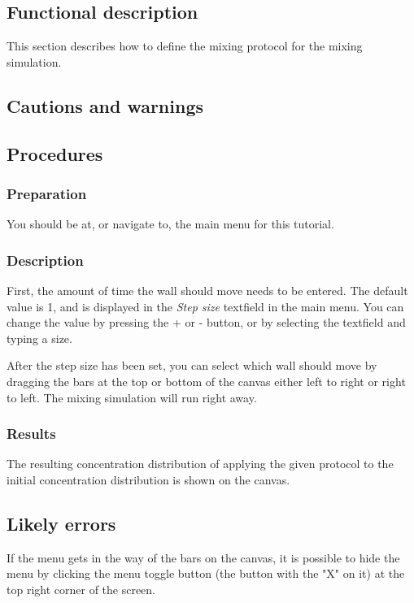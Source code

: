\subsection{Functional description}
This section describes how to define the mixing protocol for the mixing simulation.

\subsection{Cautions and warnings}

\subsection{Procedures}
\subsubsection{Preparation}
You should be at, or navigate to, the main menu for this tutorial.

\subsubsection{Description}
First, the amount of time the wall should move needs to be entered. The default value is 1, and is displayed in the \emph{Step size} textfield in the main menu. You can change the value by pressing the + or - button, or by selecting the textfield and typing a size.

After the step size has been set, you can select which wall should move by dragging the bars at the top or bottom of the canvas either left to right or right to left. The mixing simulation will run right away.

\subsubsection{Results}
The resulting concentration distribution of applying the given protocol to the initial concentration distribution is shown on the canvas.

\subsection{Likely errors}
If the menu gets in the way of the bars on the canvas, it is possible to hide the menu by clicking the menu toggle button (the button with the "X" on it) at the top right corner of the screen.


